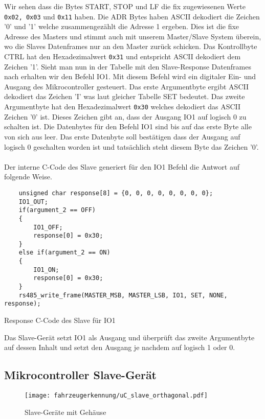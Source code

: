 Wir sehen dass die Bytes START, STOP und LF die fix zugewiesenen Werte \texttt{0x02, 0x03} und \texttt{0x11} haben. Die ADR Bytes haben ASCII dekodiert die Zeichen '0' und '1' welche zusammengezählt die Adresse 1 ergeben. 
Dies ist die fixe Adresse des Masters und stimmt auch mit unserem Master/Slave System überein, wo die Slaves Datenframes nur an den Master zurück schicken. Das Kontrollbyte CTRL hat den Hexadezimalwert \texttt{0x31} 
und entspricht ASCII dekodiert dem Zeichen '1'. Sieht man nun in der Tabelle mit den Slave-Response Datenframes nach erhalten wir den Befehl IO1. Mit diesem Befehl wird ein digitaler Ein- und Ausgang des Mikrocontroller gesteuert.
Das erste Argumentbyte ergibt ASCII dekodiert das Zeichen 'I' was laut gleicher Tabelle SET bedeutet. Das zweite Argumentbyte hat den Hexadezimalwert \texttt{0x30} welches dekodiert das ASCII Zeichen '0' ist. Dieses Zeichen gibt an,
dass der Ausgang IO1 auf logisch 0 zu schalten ist. Die Datenbytes für den Befehl IO1 sind bis auf das erste Byte alle von sich aus leer. Das erste Datenbyte soll bestätigen dass der Ausgang auf logisch 0 geschalten worden ist und tatsächlich steht 
diesem Byte das Zeichen '0'.  
\\ \\
Der interne C-Code des Slave generiert für den IO1 Befehl die Antwort auf folgende Weise.
\begin{listing}[H]
    \begin{verbatim}
    unsigned char response[8] = {0, 0, 0, 0, 0, 0, 0, 0};
    IO1_OUT;
    if(argument_2 == OFF)
    {
        IO1_OFF; 
        response[0] = 0x30;
    }
    else if(argument_2 == ON)
    {
        IO1_ON;
        response[0] = 0x30;
    }
    rs485_write_frame(MASTER_MSB, MASTER_LSB, IO1, SET, NONE, response);
    \end{verbatim}
    \caption{Response C-Code des Slave für IO1}
  \end{listing}

Das Slave-Gerät setzt IO1 als Ausgang und überprüft das zweite Argumentbyte auf dessen Inhalt und setzt den Ausgang je nachdem auf logisch 1 oder 0.
\pagebreak
\subsection{Mikrocontroller Slave-Gerät}

\begin{figure}[H]
    \centering
    \texttt{[image: fahrzeugerkennung/uC\_slave\_orthagonal.pdf]}
    \caption{Slave-Geräte mit Gehäuse}
\end{figure}


